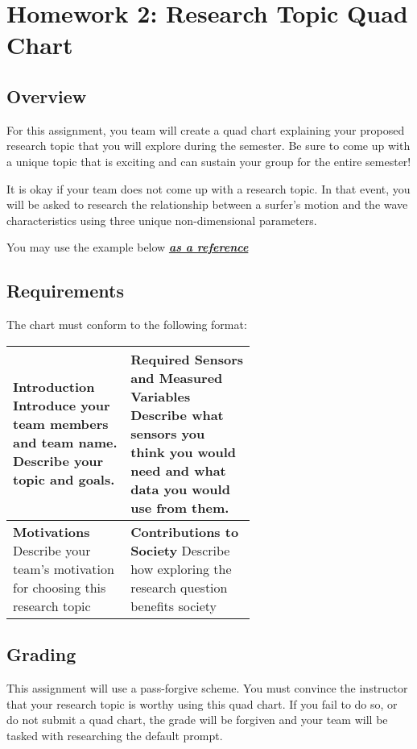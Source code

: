 \documentclass[
	letterpaper, %
	fontsize=10pt, %
	twoside=true, %
	numbers=noenddot, %
]{kaobook}
\begin{document}

\chapter*{Homework 2: Research Topic Quad Chart}

\section*{Overview}
For this assignment, you team will create a quad chart explaining your proposed research topic that you will explore during the semester.
Be sure to come up with a unique topic that is exciting and can sustain your group for the entire semester!

It is okay if your team does not come up with a research topic.
In that event, you will be asked to research the relationship between a surfer's motion and the wave characteristics using three unique non-dimensional parameters.

You may use the example below \underline{\textbf{\emph{as a reference}}}

\section*{Requirements}
The chart must conform to the following format:

\vspace{0.5cm}

{
\setlength\extrarowheight{4pt}
\begin{table}[h!]
	\label{tab:quad_chart format}
	\begin{tabular}{| p{0.3\linewidth} | p{0.3\linewidth} |}
		\hline
		\textbf{Introduction} \newline Introduce your team members and team name. Describe your topic and goals. & 
		\textbf{Required Sensors and Measured Variables} \newline Describe what sensors you think you would need and what data you would use from them. \\
		\hline
		\textbf{Motivations} \newline Describe your team's motivation for choosing this research topic &
		\textbf{Contributions to Society} \newline Describe how exploring the research question benefits society \\
		\hline
	\end{tabular}
\end{table}
}

\section*{Grading}
This assignment will use a pass-forgive scheme.
You must convince the instructor that your research topic is worthy using this quad chart.
If you fail to do so, or do not submit a quad chart, the grade will be forgiven and your team will be tasked with researching the default prompt.


\end{document}
